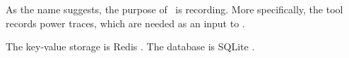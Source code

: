 
As the name suggests, the purpose of \recorder\ is recording. More specifically,
the tool records power traces, which are needed as an input to \streamer.

The key-value storage is Redis \cite{redis}. The database is SQLite
\cite{sqlite}.
